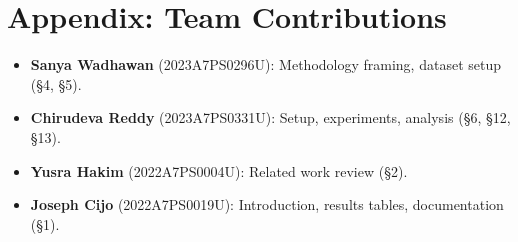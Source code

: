 \documentclass[10pt,twocolumn,a4paper]{article}
\begin{document}
\section*{Appendix: Team Contributions}
\begin{itemize}
    \item \textbf{Sanya Wadhawan} (2023A7PS0296U): Methodology framing, dataset setup (§4, §5).
    \item \textbf{Chirudeva Reddy} (2023A7PS0331U): Setup, experiments, analysis (§6, §12, §13).
    \item \textbf{Yusra Hakim} (2022A7PS0004U): Related work review (§2).
    \item \textbf{Joseph Cijo} (2022A7PS0019U): Introduction, results tables, documentation (§1).
\end{itemize}
\end{document}
